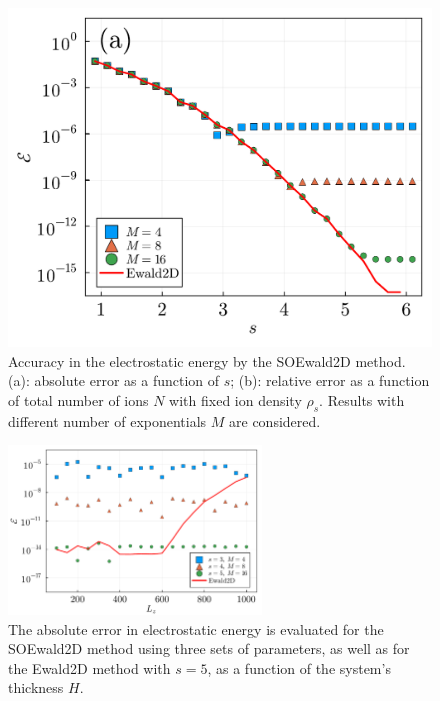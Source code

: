 \begin{figure}[ht]
	\centering
	\includegraphics[width=\textwidth]{figs/fig_error_fixn.pdf}
	\caption{
		Accuracy in the electrostatic energy by the SOEwald2D method. (a): absolute error as a function of $s$; (b): relative error as a function of total number of ions $N$ with fixed ion density $\rho_{s}$. Results with different number of exponentials $M$ are considered. 
	}
	\label{fig:error_fixn}
\end{figure}

\begin{figure}[ht]
	\centering
	\includegraphics[width=0.6\textwidth]{figs/fig_error_Lz.pdf} 
	\caption{
		The absolute error in electrostatic energy is evaluated for the SOEwald2D method using three sets of parameters, as well as for the Ewald2D method with $s=5$, as a function of the system's thickness $H$. 
	}
	\label{fig:error_Lz}
\end{figure}

